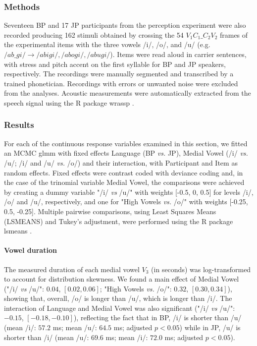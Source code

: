 \subsubsection{Methods}

Seventeen BP and 17 JP participants from the perception experiment were also recorded producing 162 stimuli obtained by crossing the 54 $V_{1}C_{1}\_C_{2}V_{2}$ frames of the experimental items with the three vowels /i/, /o/, and /u/ (e.g. $/ab\_gi/ \rightarrow /abigi/, /abogi/, /abugi/$).
Items were read aloud in carrier sentences, with stress and pitch accent on the first syllable for BP and JP speakers, respectively. The recordings were manually segmented and transcribed by a trained phonetician. Recordings with errors or unwanted noise were excluded from the analyses. Acoustic measurements were automatically extracted from the speech signal using the R package wrassp \cite{R-wrassp}.

\subsubsection{Results}

For each of the continuous response variables examined in this section, we fitted an MCMC glmm with fixed effects Language (BP \textit{vs.} JP), Medial Vowel (/i/ \textit{vs.} /u/; /i/ and /u/ \textit{vs.} /o/) and their interaction, with Participant and Item as random effects. Fixed effects were contrast coded with deviance coding and, in the case of the trinomial variable Medial Vowel, the comparisons were achieved by creating a dummy variable "/i/ \textit{vs} /u/" with weights [-0.5, 0, 0.5] for levels /i/, /o/ and /u/, respectively, and one for "High Vowels \textit{vs.} /o/" with weights [-0.25, 0.5, -0.25]. Multiple pairwise comparisons, using Least Squares Means (LSMEANS) and Tukey's adjustment, were performed using the R package lsmeans \cite{R-lsmeans}.

\paragraph{Vowel duration}

The measured duration of each medial vowel $V_{3}$ (in seconds) was log-transformed to account for distribution skewness. We found a main effect of Medial Vowel ("/i/ \textit{vs} /u/": $0.04$, $[0.02, 0.06]$; "High Vowels \textit{vs.} /o/": $0.32$, $[0.30, 0.34]$), showing that, overall, /o/ is longer than /u/, which is longer than /i/. The interaction of Language and Medial Vowel was also significant ("/i/ \textit{vs} /u/": $-0.15$, $[-0.18, -0.10]$), reflecting the fact that in BP, /i/ is shorter than /u/ (mean /i/: $57.2$ ms; mean /u/: $64.5$ ms; adjusted $p<0.05$) while in JP, /u/ is shorter than /i/ (mean /u/: $69.6$ ms; mean /i/: $72.0$ ms; adjusted $p<0.05$).

